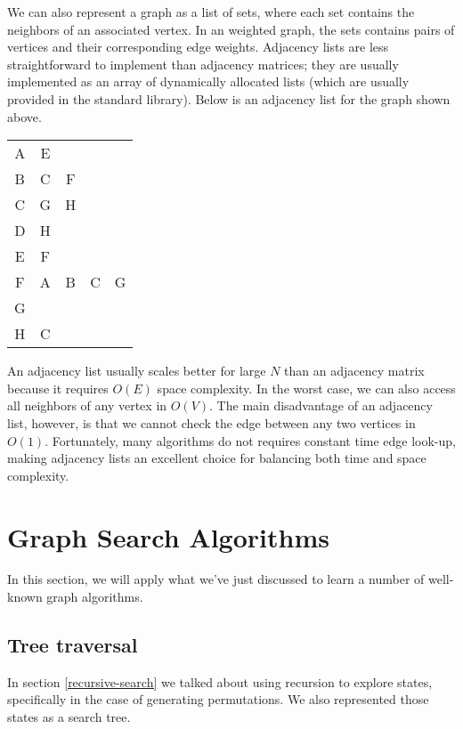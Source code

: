 We can also represent a graph as a list of sets, where each set contains the neighbors of an associated vertex. In an weighted graph, the sets contains pairs of vertices and their corresponding edge weights. Adjacency lists are less straightforward to implement than adjacency matrices; they are usually implemented as an array of dynamically allocated lists (which are usually provided in the standard library). Below is an adjacency list for the graph shown above. 

\begin{center}
\begin{minipage}{0.45\linewidth}
\begin{tabular}{ c|c c c c}
A        & E \\
B        & C & F \\
C        & G & H \\
D        & H \\
E        & F \\
F        & A & B & C & G \\
G        & \\
H        & C \\
\end{tabular}
\end{minipage}
\end{center}

An adjacency list usually scales better for large $N$ than an adjacency matrix because it requires $O(E)$ space complexity. In the worst case, we can also access all neighbors of any vertex in $O(V)$. The main disadvantage of an adjacency list, however, is that we cannot check the edge between any two vertices in $O(1)$. Fortunately, many algorithms do not requires constant time edge look-up, making adjacency lists an excellent choice for balancing both time and space complexity. 


\section{Graph Search Algorithms}

In this section, we will apply what we've just discussed to learn a number of well-known graph algorithms. 


\subsection{Tree traversal}

In section \ref{recursive-search} we talked about using recursion to explore states, specifically in the case of generating permutations. We also represented those states as a search tree.

